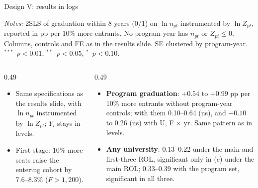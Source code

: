 \documentclass{beamer}
\newcommand{\sym}[1]{\ensuremath{^{#1}}}
\begin{document}
\begin{frame}{Design V: results in logs}
\centering
\tiny
\resizebox{0.86\textwidth}{!}{}

\vspace{0.05cm}
\parbox{0.97\textwidth}{\tiny \textit{Notes:} 2SLS of graduation within 8 years (0/1) on $\ln n_{pt}$ instrumented by $\ln Z_{pt}$, reported in pp per 10\% more entrants. No program-year has $n_{pt}$ or $Z_{pt}\le 0$. Columns, controls and FE as in the results slide. SE clustered by program-year. \sym{***}~$p<0.01$, \sym{**}~$p<0.05$, \sym{*}~$p<0.10$.}

\vspace{0.1cm}
\raggedright
\begin{columns}[T,onlytextwidth]
\begin{column}{0.49\textwidth}
\scriptsize
\begin{itemize}
    \setlength{\itemsep}{2pt}
    \item Same specifications as the results slide, with $\ln n_{pt}$ instrumented by $\ln Z_{pt}$; $Y_i$ stays in levels.
    \item First stage: 10\% more seats raise the entering cohort by 7.6--8.3\% ($F>1{,}200$).
\end{itemize}
\end{column}
\begin{column}{0.49\textwidth}
\scriptsize
\begin{itemize}
    \setlength{\itemsep}{2pt}
    \item \textbf{Program graduation}: $+0.54$ to $+0.99$ pp per 10\% more entrants without program-year controls; with them 0.10--0.64 (ns), and $-0.10$ to $0.26$ (ns) with U, F $\times$ yr. Same pattern as in levels.
    \item \textbf{Any university}: 0.13--0.22 under the main and first-three ROL, significant only in (c) under the main ROL; 0.33--0.39 with the program set, significant in all three.
\end{itemize}
\end{column}
\end{columns}
\end{frame}
\end{document}
